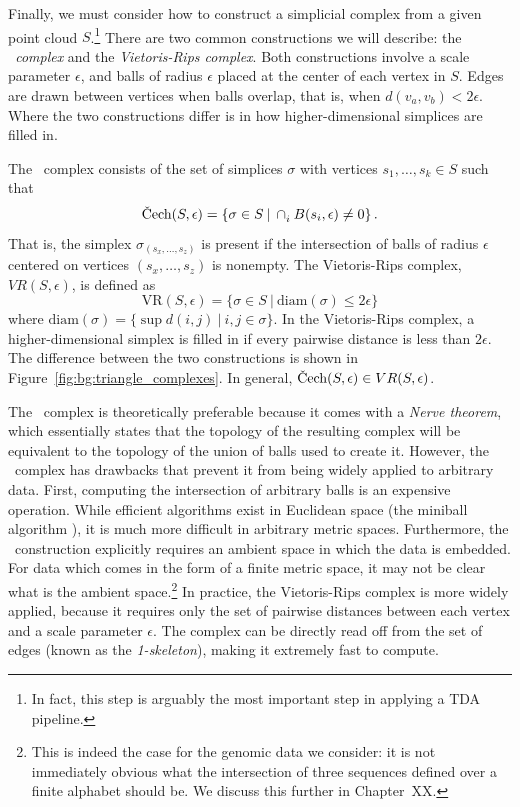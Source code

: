 Finally, we must consider how to construct a simplicial complex from a given point cloud $S$.\footnote{In fact, this step is arguably the most important step in applying a TDA pipeline.}
There are two common constructions we will describe: the \emph{\Cech\ complex} and the \emph{Vietoris-Rips complex}.
Both constructions involve a scale parameter $\epsilon$, and balls of radius $\epsilon$ placed at the center of each vertex in $S$.
Edges are drawn between vertices when balls overlap, that is, when $d(v_{a},v_{b})<2\epsilon$.
Where the two constructions differ is in how higher-dimensional simplices are filled in.

The \Cech\ complex consists of the set of simplices $\sigma$ with vertices $s_{1},\ldots,s_{k}\in S$ such that
\begin{equation}
\text{\Cech}(S, \epsilon) = \left\{ \sigma\in S \:|\: \displaystyle\cap_{i}^{} B(s_{i},\epsilon)\neq0 \right\}.
\end{equation}
That is, the simplex $\sigma_{(s_{x},\ldots,s_{z})}$ is present if the intersection of balls of radius $\epsilon$ centered on vertices $(s_{x},\ldots,s_{z}	)$ is nonempty.
The Vietoris-Rips complex, $VR(S,\epsilon)$, is defined as
\begin{equation}
\mathrm{VR}(S, \epsilon) = \{ \sigma\in S\:|\:\mathrm{diam}(\sigma) \leq 2\epsilon \}
\end{equation}
where $\mathrm{diam}(\sigma)=\{ \sup d(i,j) \:|\: i,j\in\sigma \}$.
In the Vietoris-Rips complex, a higher-dimensional simplex is filled in if every pairwise distance is less than $2\epsilon$.
The difference between the two constructions is shown in Figure~\ref{fig:bg:triangle_complexes}.
In general, $\text{\Cech}(S,\epsilon)\in VR(S,\epsilon)$.

The \Cech\ complex is theoretically preferable because it comes with a \emph{Nerve theorem}, which essentially states that the topology of the resulting complex will be equivalent to the topology of the union of balls used to create it.
However, the \Cech\ complex has drawbacks that prevent it from being widely applied to arbitrary data.
First, computing the intersection of arbitrary balls is an expensive operation.
While efficient algorithms exist in Euclidean space (the miniball algorithm \cite{Gartner:1999}), it is much more difficult in arbitrary metric spaces.
Furthermore, the \Cech\ construction explicitly requires an ambient space in which the data is embedded.
For data which comes in the form of a finite metric space, it may not be clear what is the ambient space.\footnote{This is indeed the case for the genomic data we consider: it is not immediately obvious what the intersection of three sequences defined over a finite alphabet should be. We discuss this further in Chapter~XX.}
In practice, the Vietoris-Rips complex is more widely applied, because it requires only the set of pairwise distances between each vertex and a scale parameter $\epsilon$.
The complex can be directly read off from the set of edges (known as the \emph{1-skeleton}), making it extremely fast to compute.

